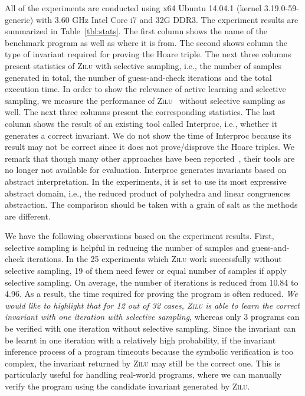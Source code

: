 All of the experiments are conducted using x64 Ubuntu 14.04.1 (kernel 3.19.0-59-generic) with 3.60 GHz Intel Core i7 and 32G DDR3. The experiment results are summarized in Table~\ref{tbl:stats}. The first column shows the name of the benchmark program as well as where it is from. The second shows column the type of invariant required for proving the Hoare triple. The next three columns present statistics of \textsc{Zilu} with selective sampling, i.e., the number of samples generated in total, the number of guess-and-check iterations and the total execution time. In order to show the relevance of active learning and selective sampling, we measure the performance of \textsc{Zilu}~\cite{zilu:repo} without selective sampling as well. The next three columns present the corresponding statistics. The last column shows the result of an existing tool called Interproc, i.e., whether it generates a correct invariant. We do not show the time of Interproc because its result may not be correct since it does not prove/disprove the Hoare triples. We remark that though many other approaches have been reported~\cite{sharma2012interpolants,sharma2013verification,DBLP:conf/esop/0001GHALN13,sharma2014invariant}, their tools are no longer not available for evaluation. Interproc generates invariants based on abstract interpretation. In the experiments, it is set to use its most expressive abstract domain, i.e., the reduced product of polyhedra and linear congruences abstraction. The comparison should be taken with a grain of salt as the methods are different.

We have the following observations based on the experiment results. First, selective sampling is helpful in reducing the number of samples and guess-and-check iterations. In the 25 experiments which \textsc{Zilu} work successfully without selective sampling, 19 of them need fewer or equal number of samples if apply selective sampling. On average, the number of iterations is reduced from 10.84 to 4.96. As a result, the time required for proving the program is often reduced.
\emph{We would like to highlight that for 12 out of 32 cases, \textsc{Zilu} is able to learn the correct invariant with one iteration with selective sampling}, whereas only 3 programs can be verified with one iteration without selective sampling. Since the invariant can be learnt in one iteration with a relatively high probability, if the invariant inference process of a program timeouts because the symbolic verification is too complex,
the invariant returned by \textsc{Zilu} may still be the correct one.
This is particularly useful for handling real-world programs,
where we can manually verify the program using the candidate invariant generated by \textsc{Zilu}.



